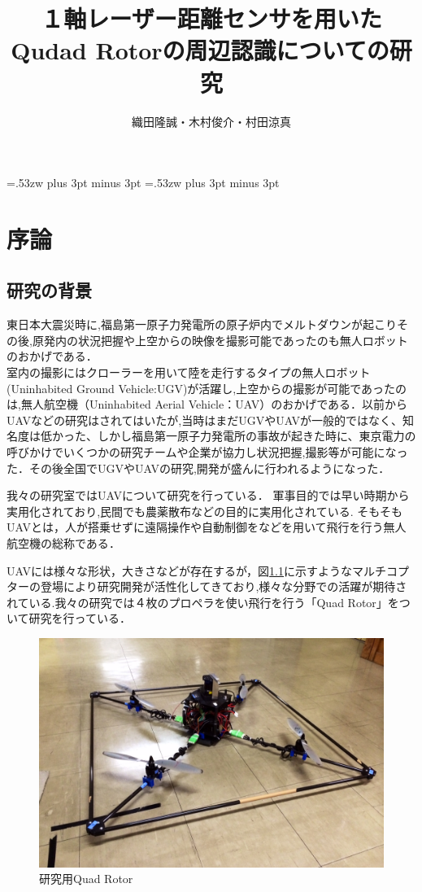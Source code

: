 \documentclass[12pt,oneside]{sotsuken_paper}
\title{１軸レーザー距離センサを用いたQudad Rotorの周辺認識についての研究}
\author{織田隆誠・木村俊介・村田涼真}
\begin{document}
\setlength{\baselineskip}{9truemm}

\kanjiskip=.53zw plus 3pt minus 3pt
\xkanjiskip=.53zw plus 3pt minus 3pt

\tableofcontents


\chapter{序論}
\section{研究の背景}
東日本大震災時に,福島第一原子力発電所の原子炉内でメルトダウンが起こりその後,原発内の状況把握や上空からの映像を撮影可能であったのも無人ロボットのおかげである．\\室内の撮影にはクローラーを用いて陸を走行するタイプの無人ロボット(Uninhabited Ground Vehicle:UGV)が活躍し,上空からの撮影が可能であったのは,無人航空機（Uninhabited Aerial Vehicle：UAV）のおかげである．以前からUAVなどの研究はされてはいたが,当時はまだUGVやUAVが一般的ではなく、知名度は低かった、しかし福島第一原子力発電所の事故が起きた時に、東京電力の呼びかけでいくつかの研究チームや企業が協力し状況把握,撮影等が可能になった．その後全国でUGVやUAVの研究,開発が盛んに行われるようになった．


我々の研究室ではUAVについて研究を行っている．
軍事目的では早い時期から実用化されており,民間でも農薬散布などの目的に実用化されている.
そもそもUAVとは，人が搭乗せずに遠隔操作や自動制御をなどを用いて飛行を行う無人航空機の総称である\cite{hirokawa2007}．


UAVには様々な形状，大きさなどが存在するが，図\ref{fig:1}に示すようなマルチコプターの登場により研究開発が活性化してきており,様々な分野での活躍が期待されている.我々の研究では４枚のプロペラを使い飛行を行う「Quad Rotor」をついて研究を行っている．

\begin{figure}[H]
\begin{center}
\includegraphics[width=120mm]{img/1.jpg}
\end{center}
\caption{研究用Quad Rotor}
\label{fig:1}
\end{figure}
\end{document}
